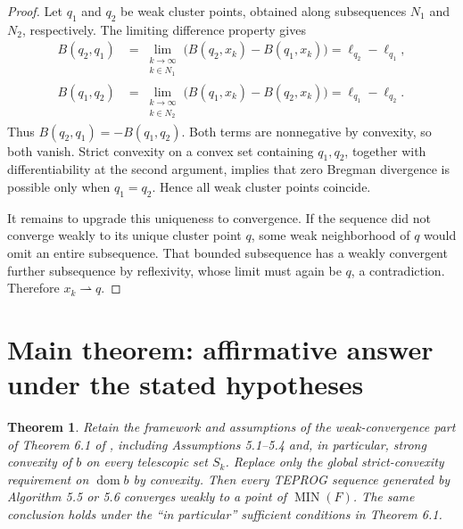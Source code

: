\documentclass[11pt]{article}
\newtheorem*{theorem}{Theorem}
\newcommand{\MIN}{\operatorname{MIN}}
\newcommand{\domm}{\operatorname{dom}}
\begin{document}
\begin{proof}
Let \(q_1\) and \(q_2\) be weak cluster points, obtained along subsequences
\(N_1\) and \(N_2\), respectively. The limiting difference property gives
\begin{align*}
B(q_2,q_1)
 &=\lim_{\substack{k\to\infty\\k\in N_1}}
   \bigl(B(q_2,x_k)-B(q_1,x_k)\bigr)
 =\ell_{q_2}-\ell_{q_1},\\
B(q_1,q_2)
 &=\lim_{\substack{k\to\infty\\k\in N_2}}
   \bigl(B(q_1,x_k)-B(q_2,x_k)\bigr)
 =\ell_{q_1}-\ell_{q_2}.
\end{align*}
Thus \(B(q_2,q_1)=-B(q_1,q_2)\). Both terms are nonnegative by convexity,
so both vanish. Strict convexity on a convex set containing \(q_1,q_2\),
together with differentiability at the second argument, implies that zero
Bregman divergence is possible only when \(q_1=q_2\). Hence all weak cluster
points coincide.

It remains to upgrade this uniqueness to convergence. If the sequence did not
converge weakly to its unique cluster point \(q\), some weak neighborhood of
\(q\) would omit an entire subsequence. That bounded subsequence has a weakly
convergent further subsequence by reflexivity, whose limit must again be \(q\),
a contradiction. Therefore \(x_k\rightharpoonup q\).
\end{proof}

\section*{Main theorem: affirmative answer under the stated hypotheses}

\begin{theorem}
Retain the framework and assumptions of the weak-convergence part of Theorem
6.1 of \cite{RRD}, including Assumptions 5.1--5.4 and, in particular, strong
convexity of \(b\) on every telescopic set \(S_k\). Replace only the global
strict-convexity requirement on \(\domm b\) by convexity. Then every TEPROG
sequence generated by Algorithm 5.5 or 5.6 converges weakly to a point of
\(\MIN(F)\). The same conclusion holds under the ``in particular'' sufficient
conditions in Theorem 6.1.
\end{theorem}
\end{document}
